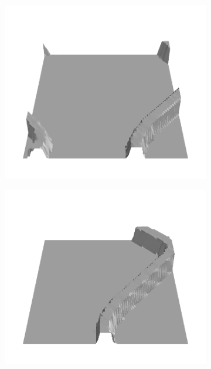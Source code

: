 \documentclass[../document.tex]{subfiles}
\begin{document}
\begin{figure}[H]
\begin{subfigure}[b]{0.19\textwidth}
\end{subfigure}  
    \begin{subfigure}[b]{0.19\textwidth}
    \includegraphics[width=\linewidth]{../img/bars1-example-patches/3d/4.png}    
\end{subfigure}
    \begin{subfigure}[b]{0.19\textwidth}
    \includegraphics[width=\linewidth]{../img/bars1-example-patches/3d/7.png}    
\end{subfigure}  

\end{figure}
\end{document}
